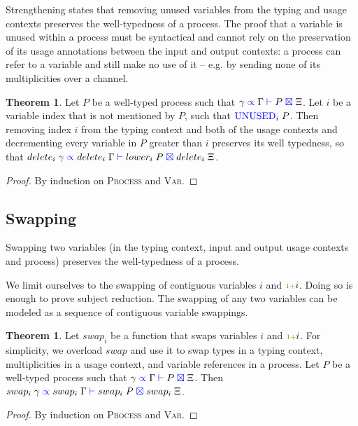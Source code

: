 \documentclass[a4paper,UKenglish,cleveref, autoref, thm-restate,authorcolumns]{lipics-v2019}
\theoremstyle{definition}
\newtheorem{nitheorem}[theorem]{Theorem}
\newcommand{\type}[1]{\textcolor{blue}{\operatorname{#1}}}
\newcommand{\constr}[1]{\textcolor{olive}{\operatorname{#1}}}
\newcommand{\suc}{\constr{\scriptstyle 1+}}
\newcommand{\types}[4]{#1 \; \type{\propto} \; #2 \; \type{\vdash} \; #3 \; \type{\boxtimes} \; #4}
\newcommand{\Unused}{\type{UNUSED}}
\begin{document}
Strengthening states that removing unused variables from the typing and usage contexts preserves the well-typedness of a process.
The proof that a variable is unused within a process must be syntactical and cannot rely on the preservation of its usage annotations between the input and output contexts: a process can refer to a variable and still make no use of it -- e.g. by sending none of its multiplicities over a channel.

\begin{nitheorem}
  \label{thm:strengthening}
  Let $P$ be a well-typed process such that $\types{\gamma}{\Gamma}{P}{\Xi}$.
  Let $i$ be a variable index that is not mentioned by $P$, such that $\Unused_i \; P$.
  Then removing index $i$ from the typing context and both of the usage contexts and decrementing every variable in $P$ greater than $i$ preserves its well typedness, so that $\types{delete_i \; \gamma}{delete_i \; \Gamma}{lower_i \; P}{delete_i \; \Xi}$.
\end{nitheorem}
\begin{proof}
  By induction on \textsc{Process} and \textsc{Var}.
\end{proof}

\subsection{Swapping}
\label{swapping}

Swapping two variables (in the typing context, input and output usage contexts and process) preserves the well-typedness of a process.

\begin{remark}
  We limit ourselves to the swapping of contiguous variables $i$ and $\suc i$.
  Doing so is enough to prove subject reduction.
  The swapping of any two variables can be modeled as a sequence of contiguous variable swappings.
\end{remark}


\begin{nitheorem}
  \label{thm:swapping}
  Let $swap_i$ be a function that swaps variables $i$ and $\suc i$.
  For simplicity, we overload $swap$ and use it to swap types in a typing context, multiplicities in a usage context, and variable references in a process.
  Let $P$ be a well-typed process such that $\types{\gamma}{\Gamma}{P}{\Xi}$.
  Then $\types{swap_i \; \gamma}{swap_i \; \Gamma}{swap_i \; P}{swap_i \; \Xi}$.
\end{nitheorem}
\begin{proof}
  By induction on \textsc{Process} and \textsc{Var}.
\end{proof}
\end{document}
